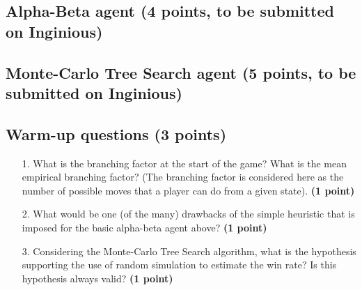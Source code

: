 \documentclass[11pt,a4paper]{report}
\begin{document}
\subsection{Alpha-Beta agent (4 points, to be submitted on Inginious)}
\medskip


\subsection{Monte-Carlo Tree Search agent (5 points, to be submitted on Inginious)}
\medskip


\subsection{Warm-up questions (3 points)}
\begin{enumerate}
\item[1.] What is the branching factor at the start of the game? What is the mean empirical branching factor? (The branching factor is considered here as the number of possible moves that a player can do from a given state). \textbf{(1 point)}
\end{enumerate}

\begin{answers}[5cm]
\end{answers}



\begin{enumerate}
\item[2.] What would be one (of the many) drawbacks of the simple heuristic that is imposed for the basic alpha-beta agent above? \textbf{(1 point)}
\end{enumerate}

\begin{answers}[10cm]
\end{answers}



\begin{enumerate}
\item[3.] Considering the Monte-Carlo Tree Search algorithm, what is the hypothesis supporting the use of random simulation to estimate the win rate? Is this hypothesis always valid? \textbf{(1 point)}
\end{enumerate}

\begin{answers}[15cm]
\end{answers}
\end{document}
